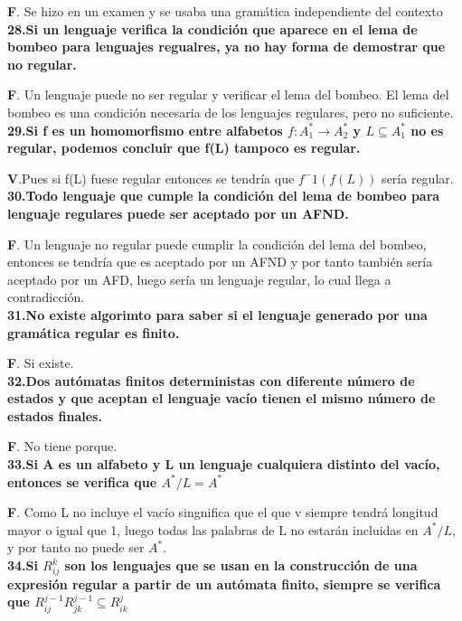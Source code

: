 \documentclass[a4paper,11pt]{article}
\begin{document}
\textbf{F}. Se hizo en un examen y se usaba una gramática independiente del contexto\\

\textbf{28.Si un lenguaje verifica la condición que aparece en el lema de bombeo para lenguajes regualres, ya no hay forma de demostrar que no regular.}

\textbf{F}. Un lenguaje puede no ser regular y verificar el lema del bombeo. El lema del bombeo es una condición necesaria de los lenguajes regulares, pero no suficiente. \\

\textbf{29.Si f es un homomorfismo entre alfabetos $f:A^*_1\rightarrow A_2^*$ y $L \subseteq A_1^*$ no es regular, podemos concluir que f(L) tampoco es regular.}

\textbf{V}.Pues si f(L) fuese regular entonces se tendría que $f^-1(f(L))$ sería regular. \\

\textbf{30.Todo lenguaje que cumple la condición del lema de bombeo para lenguaje regulares puede ser aceptado por un AFND.}

\textbf{F}. Un lenguaje no regular puede cumplir la condición del lema del bombeo, entonces se tendría que es aceptado por un AFND y por tanto también sería aceptado por un AFD, luego sería un lenguaje regular, lo cual llega a contradicción. \\

\textbf{31.No existe algorimto para saber si el lenguaje generado por una gramática regular es finito.}

\textbf{F}. Si existe. \\

\textbf{32.Dos autómatas finitos deterministas con diferente número de estados y que aceptan el lenguaje vacío tienen el mismo número de estados finales.}

\textbf{F}. No tiene porque. \\

\textbf{33.Si A es un alfabeto y L un lenguaje cualquiera distinto del vacío, entonces se verifica que $A^*/L=A^*$}

\textbf{F}. Como L no incluye el vacío singnifica que el que v siempre tendrá longitud mayor o igual que 1, luego todas las palabras de L no estarán incluidas en $A^*/L$, y por tanto no puede ser $A^*$. \\

\textbf{34.Si $R_{ij}^k$ son los lenguajes que se usan en la construcción de una expresión regular a partir de un autómata finito, siempre se verifica que $R_{ij}^{j-1}R_{jk}^{j-1}\subseteq R_{ik}^j$}
\end{document}
